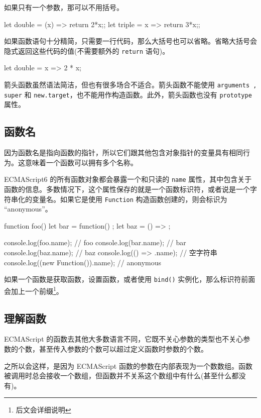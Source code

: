 如果只有一个参数，那可以不用括号。

\begin{JavaScript}
let double = (x) => {return 2*x;};
let triple = x => {return 3*x;};
\end{JavaScript}

如果函数语句十分精简，只需要一行代码，那么大括号也可以省略。省略大括号会隐式返回这些代码的值(不需要额外的 \texttt{return} 语句)。

\begin{JavaScript}
let double = x => 2 * x;
\end{JavaScript}

箭头函数虽然语法简洁，但也有很多场合不适合。箭头函数不能使用 \texttt{arguments , super} 和 \texttt{new.target}，也不能用作构造函数。此外，箭头函数也没有 \texttt{prototype} 属性。

\subsection{函数名}

因为函数名是指向函数的指针，所以它们跟其他包含对象指针的变量具有相同行为。这意味着一个函数可以拥有多个名称。

ECMAScript6 的所有函数对象都会暴露一个和只读的 \texttt{name} 属性，其中包含关于函数的信息。多数情况下，这个属性保存的就是一个函数标识符，或者说是一个字符串化的变量名。如果它是使用 \texttt{Function} 构造函数创建的，则会标识为 ``anonymous''。

\begin{JavaScript}
function foo() {}
let bar = function() {};
let baz = () => {};

console.log(foo.name);      // foo
console.log(bar.name);      // bar
console.log(baz.name);      // baz
console.log(() => {}.name);      // 空字符串
console.log((new Function()).name);      // anonymous
\end{JavaScript}

如果一个函数是获取函数，设置函数，或者使用 \texttt{bind()} 实例化，那么标识符前面会加上一个前缀\footnote{后文会详细说明}。

\subsection{理解函数}

ECMAScript 的函数去其他大多数语言不同，它既不关心参数的类型也不关心参数的个数，甚至传入参数的个数可以超过定义函数时参数的个数。

之所以会这样，是因为 ECMAScript 函数的参数在内部表现为一个数数组。函数被调用时总会接收一个数组，但函数并不关系这个数组中有什么(甚至什么都没有)。

